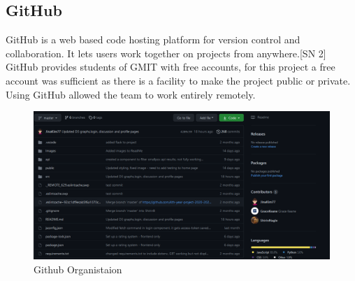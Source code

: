 \subsection{GitHub}
GitHub is a web based code hosting platform for version control and collaboration. It lets users work together on projects from anywhere.[SN 2]
GitHub provides students of GMIT with free accounts, for this project a free account was sufficient as there is a facility to make the project public or private. Using GitHub allowed the team to work entirely remotely.
\begin{figure}
    \centering
    \includegraphics[scale=0.5]{img/github.PNG}
    \caption{Github Organistaion}
    \label{fig:my_label1}
\end{figure}    
      
      



